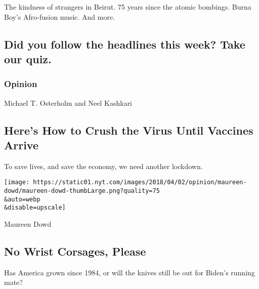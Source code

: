 The kindness of strangers in Beirut. 75 years since the atomic bombings.
Burna Boy's Afro-fusion music. And more.

\href{/interactive/2020/08/07/briefing/beirut-tiktok-census-bureau-news-quiz.html}{}

\hypertarget{did-you-follow-the-headlines-this-week-take-our-quiz}{%
\subsection{Did you follow the headlines this week? Take our
quiz.}\label{did-you-follow-the-headlines-this-week-take-our-quiz}}

\href{/2020/08/07/briefing/best-weekend-reads.html}{}

\href{https://www.nytimes.com/section/opinion?pagetype=Homepage\&action=click\&module=Opinion}{}

\hypertarget{opinion}{%
\subsubsection{Opinion}\label{opinion}}

\href{/2020/08/07/opinion/coronavirus-lockdown-unemployment-death.html}{}

Michael T. Osterholm and Neel Kashkari

\hypertarget{heres-how-to-crush-the-virus-until-vaccines-arrive}{%
\subsection{Here's How to Crush the Virus Until Vaccines
Arrive}\label{heres-how-to-crush-the-virus-until-vaccines-arrive}}

To save lives, and save the economy, we need another lockdown.

\href{/2020/08/08/opinion/sunday/biden-vice-president-geraldine-ferraro.html}{}

\texttt{[image: https://static01.nyt.com/images/2018/04/02/opinion/maureen-dowd/maureen-dowd-thumbLarge.png?quality=75\\\&auto=webp\\\&disable=upscale]}

Maureen Dowd

\hypertarget{no-wrist-corsages-please}{%
\subsection{No Wrist Corsages, Please}\label{no-wrist-corsages-please}}

Has America grown since 1984, or will the knives still be out for
Biden's running mate?

